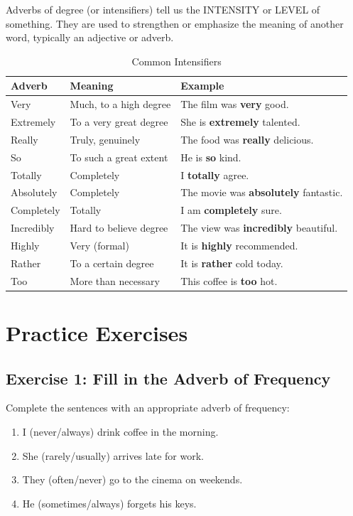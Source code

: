 Adverbs of degree (or intensifiers) tell us the INTENSITY or LEVEL of something. They are used to strengthen or emphasize the meaning of another word, typically an adjective or adverb.

\begin{table}[h]
\centering
\begin{tabular}{|l|l|l|}
\hline
\textbf{Adverb} & \textbf{Meaning} & \textbf{Example} \\
\hline
Very & Much, to a high degree & The film was \textbf{very} good. \\
\hline
Extremely & To a very great degree & She is \textbf{extremely} talented. \\
\hline
Really & Truly, genuinely & The food was \textbf{really} delicious. \\
\hline
So & To such a great extent & He is \textbf{so} kind. \\
\hline
Totally & Completely & I \textbf{totally} agree. \\
\hline
Absolutely & Completely & The movie was \textbf{absolutely} fantastic. \\
\hline
Completely & Totally & I am \textbf{completely} sure. \\
\hline
Incredibly & Hard to believe degree & The view was \textbf{incredibly} beautiful. \\
\hline
Highly & Very (formal) & It is \textbf{highly} recommended. \\
\hline
Rather & To a certain degree & It is \textbf{rather} cold today. \\
\hline
Too & More than necessary & This coffee is \textbf{too} hot. \\
\hline
\end{tabular}
\caption{Common Intensifiers}
\end{table}

\section{Practice Exercises}

\subsection{Exercise 1: Fill in the Adverb of Frequency}
Complete the sentences with an appropriate adverb of frequency:

\begin{enumerate}
    \item I \underline{\hspace{3cm}} (never/always) drink coffee in the morning.
    \item She \underline{\hspace{3cm}} (rarely/usually) arrives late for work.
    \item They \underline{\hspace{3cm}} (often/never) go to the cinema on weekends.
    \item He \underline{\hspace{3cm}} (sometimes/always) forgets his keys.
\end{enumerate}

